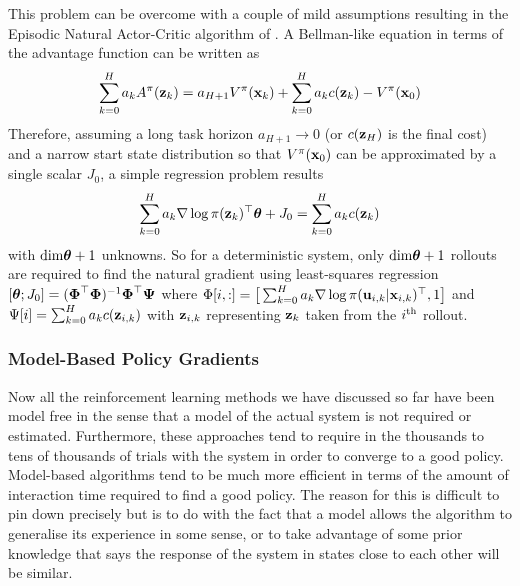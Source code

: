 This problem can be overcome with a couple of mild assumptions resulting in the Episodic Natural Actor-Critic algorithm of \cite{PVS05}. A Bellman-like equation in terms of the advantage function can be written as
\begin{equation*}
\sum_{k=0}^H a_k A^\pi(\mathbf{z}_k) = a_{H+1}V^\pi(\mathbf{x}_k) + \sum_{k=0}^H a_k c(\mathbf{z}_k) - V^\pi(\mathbf{x}_0)
\end{equation*}
Therefore, assuming a long task horizon $a_{H+1} \rightarrow 0$ (or $c(\mathbf{z}_H)$ is the final cost) and a narrow start state distribution so that $V^\pi(\mathbf{x}_0)$ can be approximated by a single scalar $J_0$, a simple regression problem results
\begin{equation*}
\sum_{k=0}^H a_k \nabla\log\pi(\mathbf{z}_k)^\top \boldsymbol{\theta} + J_0 = \sum_{k=0}^H a_k c(\mathbf{z}_k)
\end{equation*}
with $\mathrm{dim}\boldsymbol{\theta} +1$ unknowns. So for a deterministic system, only $\mathrm{dim}\boldsymbol{\theta} +1$ rollouts are required to find the natural gradient using least-squares regression
$[\boldsymbol{\theta}; J_0 ] = (\boldsymbol{\Phi}^\top \boldsymbol{\Phi})^{-1} \boldsymbol{\Phi}^\top\boldsymbol{\Psi}$
where $\Phi[i,:] = \big[\sum_{k=0}^H a_k \nabla\log\pi(\mathbf{u}_{i,k}|\mathbf{x}_{i,k})^\top,1\big]$ and $\Psi[i] = \sum_{k=0}^H a_kc(\mathbf{z}_{i,k})$ with $\mathbf{z}_{i,k}$ representing $\mathbf{z}_k$ taken from the $i^{\text{th}}$ rollout.




%


\subsubsection{Model-Based Policy Gradients}
Now all the reinforcement learning methods we have discussed so far have been model free in the sense that a model of the actual system is not required or estimated. Furthermore, these approaches tend to require in the thousands to tens of thousands of trials with the system in order to converge to a good policy. Model-based algorithms tend to be much more efficient in terms of the amount of interaction time required to find a good policy. The reason for this is difficult to pin down precisely but is to do with the fact that a model allows the algorithm to generalise its experience in some sense, or to take advantage of some prior knowledge that says the response of the system in states close to each other will be similar.

